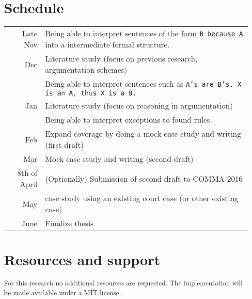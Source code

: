 \documentclass[a4paper]{article}
\begin{document}
\section*{Schedule}
\begin{tabularx}{\linewidth}{r|X}
    Late Nov & Being able to interpret sentences of the form \texttt{B because A} into a intermediate formal structure.\\
    Dec & Literature study (focus on previous research, argumentation schemes)\\
        & Being able to interpret sentences such as \texttt{A's are B's. X is an A, thus X is a B.} \\
    Jan & Literature study (focus on reasoning in argumentation)\\
        & Being able to interpret exceptions to found rules.\\
    Feb & Expand coverage by doing a mock case study and writing (first draft)\\
    Mar & Mock case study and writing (second draft)\\
    8th of April & (Optionally) Submission of second draft to COMMA 2016\\
    May  & case study using an existing court case (or other existing case)\\
    June & Finalize thesis\\
\end{tabularx}

\section*{Resources and support}
For this research no additional resources are requested. The implementation will be made available under a MIT license.


{}
\end{document}
